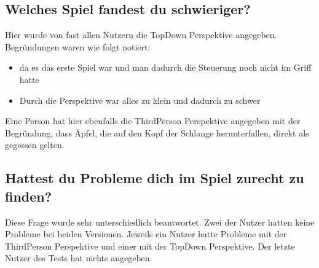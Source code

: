 \subsection{Welches Spiel fandest du schwieriger?}
Hier wurde von fast allen Nutzern die TopDown Perspektive angegeben. Begründungen waren wie folgt notiert:
\begin{itemize}
\item da es das erste Spiel war und man dadurch die Steuerung noch nicht im Griff hatte
\item Durch die Perspektive war alles zu klein und dadurch zu schwer
\end{itemize}
Eine Person hat hier ebenfalls die ThirdPerson Perspektive angegeben mit der Begründung, dass Äpfel, die auf den Kopf der Schlange herunterfallen, direkt als gegessen gelten.
\subsection{Hattest du Probleme dich im Spiel zurecht zu finden?}
Diese Frage wurde sehr unterschiedlich beantwortet. Zwei der Nutzer hatten keine Probleme bei beiden Versionen. Jeweils ein Nutzer hatte Probleme mit der ThirdPerson Perspektive und einer mit der TopDown Perspektive. Der letzte Nutzer des Tests hat nichts angegeben.